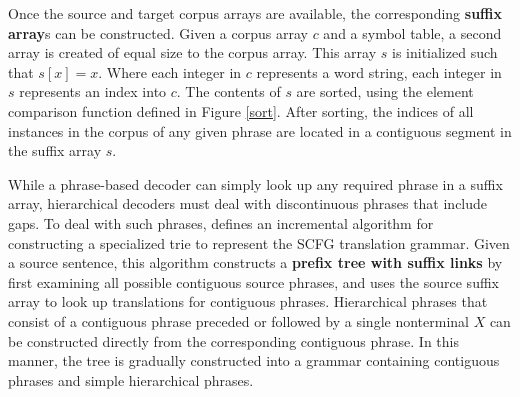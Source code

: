 \documentclass{pbml}
\begin{document}
Once the source and target corpus arrays are available, the corresponding {\bf suffix array}s can be constructed. Given a corpus array $c$ and a symbol table, a second array is created of equal size to the corpus array. This array $s$ is initialized such that $s[x] = x$. Where each integer in $c$ represents a word string, each integer in $s$ represents an index into $c$. The contents of $s$ are sorted, using the element comparison function defined in Figure \ref{sort}. After sorting, the indices of all instances in the corpus of any given phrase are located in a contiguous segment in the suffix array $s$.

While a phrase-based decoder can simply look up any required phrase in a suffix array, hierarchical decoders must deal with discontinuous phrases that include gaps. To deal with such phrases,  defines an incremental algorithm for constructing a specialized trie \cite{Fredkin1960} to represent the SCFG translation grammar. Given a source sentence, this algorithm constructs a {\bf prefix tree with suffix links} by first examining all possible contiguous source phrases, and uses the source suffix array to look up translations for contiguous phrases. Hierarchical phrases that consist of a contiguous phrase preceded or followed by a single nonterminal $X$ can be constructed directly from the corresponding contiguous phrase. In this manner, the tree is gradually constructed into a grammar containing contiguous phrases and simple hierarchical phrases. 
\end{document}
